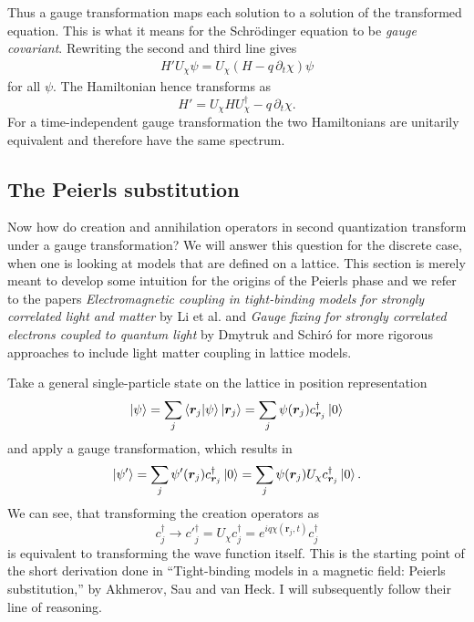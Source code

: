 \documentclass[../../main]{subfiles}
\begin{document}
Thus a gauge transformation maps each solution to a solution of the transformed equation. This is what it means for the Schrödinger equation to be \emph{gauge covariant}. Rewriting the second and third line gives
\begin{align*}
    H' U_\chi \psi = U_\chi (H -q \, \partial_t \chi)\psi 
\end{align*}
for all $\psi$. The Hamiltonian hence transforms as
\begin{equation*}
    H' = U_\chi H U_\chi^\dagger - q\, \partial_t \chi .
\end{equation*}
For a time-independent gauge transformation the two Hamiltonians are unitarily equivalent and therefore have the same spectrum.

\subsection{The Peierls substitution}

Now how do creation and annihilation operators in second quantization transform under a gauge transformation? We will answer this question for the discrete case, when one is looking at models that are defined on a lattice. This section is merely meant to develop some intuition for the origins of the Peierls phase and we refer to the papers \emph{Electromagnetic coupling in tight-binding models for strongly correlated light and matter} by Li et al. and \emph{Gauge fixing for strongly correlated electrons coupled to quantum light} by Dmytruk and Schiró for more rigorous approaches to include light matter coupling in lattice models.

Take a general single-particle state on the lattice in position representation
\begin{equation*}
    \left\lvert \psi \right\rangle 
    = \sum_j \left\langle \bm r_j \middle| \psi \right\rangle \left\lvert \bm r_j \right\rangle 
    = \sum_j \psi(\bm r_j) c^\dagger_{\bm r_j} \left\lvert 0 \right\rangle
\end{equation*}
and apply a gauge transformation, which results in
\begin{equation*}
    \left\lvert \psi' \right\rangle 
    = \sum_j \psi'(\bm r_j) c^\dagger_{\bm r_j} \left\lvert 0 \right\rangle
    = \sum_j \psi(\bm r_j) U_\chi c^\dagger_{\bm r_j} \left\lvert 0 \right\rangle.
\end{equation*}
We can see, that transforming the creation operators as
\begin{equation}
    c^\dagger_j \to c'^\dagger_j = U_\chi c^\dagger_j = e^{iq\chi(\bm r_j, t)} c^\dagger_j  
\end{equation}
is equivalent to transforming the wave function itself. This is the starting point of the short derivation done in “Tight-binding models in a magnetic field: Peierls substitution,” by Akhmerov, Sau and van Heck. I will subsequently follow their line of reasoning.
\end{document}
